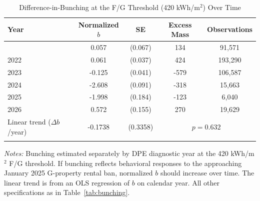 \begin{table}[htbp]
\centering
\caption{Difference-in-Bunching at the F/G Threshold (420 kWh/m$^2$) Over Time}
\label{tab:dib}
\begin{tabular}{lcccc}
\hline\hline
Year & Normalized $b$ & SE & Excess Mass & Observations \\
\hline
\addlinespace
2021 & 0.057 & (0.067) & 134 & 91,571 \\
2022 & 0.061 & (0.037) & 424 & 193,290 \\
2023 & -0.125 & (0.041) & -579 & 106,587 \\
2024 & -2.608 & (0.091) & -318 & 15,663 \\
2025 & -1.998 & (0.184) & -123 & 6,040 \\
2026 & 0.572 & (0.155) & 270 & 19,629 \\
\addlinespace
\hline
Linear trend ($\Delta b$/year) & -0.1738 & (0.3358) & \multicolumn{2}{c}{$p = 0.632$} \\
\addlinespace
\hline\hline
\end{tabular}
\begin{tablenotes}
\small
\item \textit{Notes:} Bunching estimated separately by DPE diagnostic year at the 420 kWh/m$^2$ F/G threshold. If bunching reflects behavioral responses to the approaching January 2025 G-property rental ban, normalized $b$ should increase over time. The linear trend is from an OLS regression of $b$ on calendar year. All other specifications as in Table~\ref{tab:bunching}.
\end{tablenotes}
\end{table}
